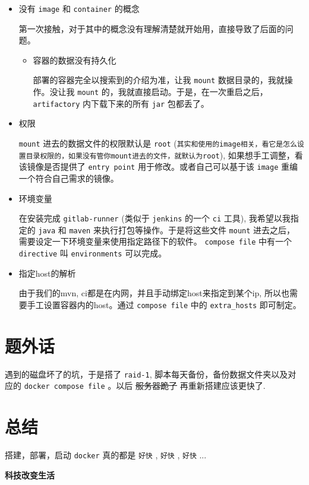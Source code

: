 \documentclass[11pt,a4paper]{article}
\begin{document}
\begin{itemize}
\item 没有 \verb~image~ 和 \verb~container~ 的概念

第一次接触，对于其中的概念没有理解清楚就开始用，直接导致了后面的问题。

\begin{itemize}
\item 容器的数据没有持久化

部署的容器完全以搜索到的介绍为准，让我 \verb~mount~ 数据目录的，我就操作。没让我 \verb~mount~ 的，我就直接启动。于是，在一次重启之后， \verb~artifactory~ 内下载下来的所有 \verb~jar~ 包都丢了。
\end{itemize}

\item 权限

\verb~mount~ 进去的数据文件的权限默认是 \verb~root~ (\texttt{其实和使用的image相关，看它是怎么设置目录权限的，如果没有管你mount进去的文件，就默认为root}), 如果想手工调整，看该镜像是否提供了 \verb~entry point~ 用于修改。或者自己可以基于该 \verb~image~ 重编一个符合自己需求的镜像。

\item 环境变量

在安装完成 \verb~gitlab-runner~ (类似于 \verb~jenkins~ 的一个 \verb~ci~ 工具), 我希望以我指定的 \verb~java~ 和 \verb~maven~ 来执行打包等操作。于是将这些文件 \verb~mount~ 进去之后， 需要设定一下环境变量来使用指定路径下的软件。 \verb~compose file~ 中有一个 \verb~directive~ 叫 \verb~environments~ 可以完成。

\item 指定host的解析

由于我们的mvn, ci都是在内网，并且手动绑定host来指定到某个ip, 所以也需要手工设置容器内的host。通过 \verb~compose file~ 中的 \verb~extra_hosts~ 即可制定。
\end{itemize}

\section*{题外话}
\label{sec-4}

遇到的磁盘坏了的坑，于是搭了 \verb~raid-1~, 脚本每天备份，备份数据文件夹以及对应的 \verb~docker compose file~ 。以后 \sout{服务器跪了} 再重新搭建应该更快了.

\section*{总结}
\label{sec-5}

搭建，部署，启动 \verb~docker~ 真的都是 \verb~好快~ , \verb~好快~ , \verb~好快~  ...

\textbf{科技改变生活}
\end{document}
